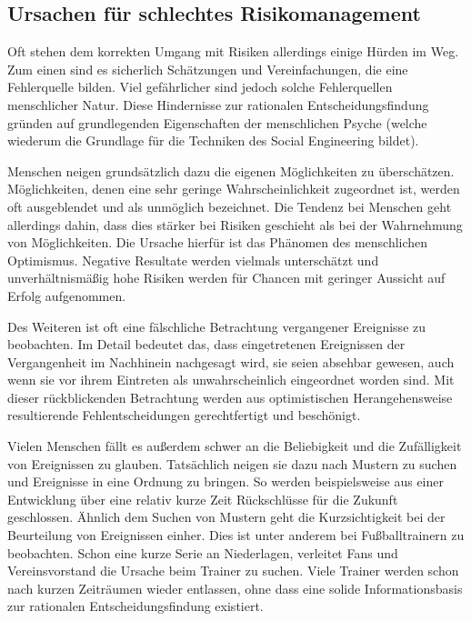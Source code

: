 \citep{risikomanagement}

\subsection{Ursachen für schlechtes Risikomanagement}\label{sec:ursachen}
Oft stehen dem korrekten Umgang mit Risiken allerdings einige Hürden im Weg. Zum einen sind es sicherlich Schätzungen und Vereinfachungen, die eine Fehlerquelle bilden. Viel gefährlicher sind jedoch solche Fehlerquellen menschlicher Natur. Diese Hindernisse zur rationalen Entscheidungsfindung gründen auf grundlegenden Eigenschaften der menschlichen Psyche (welche wiederum die Grundlage für die Techniken des Social Engineering bildet).

Menschen neigen grundsätzlich dazu die eigenen Möglichkeiten zu überschätzen.
Möglichkeiten, denen eine sehr geringe Wahrscheinlichkeit zugeordnet ist, werden oft ausgeblendet und
als unmöglich bezeichnet.
Die Tendenz bei Menschen geht allerdings dahin, dass dies stärker bei Risiken geschieht als bei der
Wahrnehmung von Möglichkeiten.
Die Ursache hierfür ist das Phänomen des menschlichen Optimismus.
Negative Resultate werden vielmals unterschätzt und unverhältnismäßig hohe Risiken werden für Chancen
mit geringer Aussicht auf Erfolg aufgenommen.

Des Weiteren ist oft eine fälschliche Betrachtung vergangener Ereignisse zu beobachten.
Im Detail bedeutet das, dass eingetretenen Ereignissen der Vergangenheit im Nachhinein nachgesagt
wird, sie seien absehbar gewesen, auch wenn sie vor ihrem Eintreten als unwahrscheinlich eingeordnet
worden sind.
Mit dieser rückblickenden Betrachtung werden aus optimistischen Herangehensweise resultierende
Fehlentscheidungen gerechtfertigt und beschönigt.

Vielen Menschen fällt es außerdem schwer an die Beliebigkeit und die Zufälligkeit von Ereignissen zu
glauben.
Tatsächlich neigen sie dazu nach Mustern zu suchen und Ereignisse in eine Ordnung zu bringen.
So werden beispielsweise aus einer Entwicklung über eine relativ kurze Zeit Rückschlüsse für die Zukunft geschlossen.
Ähnlich dem Suchen von Mustern geht die Kurzsichtigkeit bei der Beurteilung von Ereignissen einher.
Dies ist unter anderem bei Fußballtrainern zu beobachten.
Schon eine kurze Serie an Niederlagen, verleitet Fans und Vereinsvorstand die Ursache beim Trainer zu
suchen.
Viele Trainer werden schon nach kurzen Zeiträumen wieder entlassen, ohne dass eine solide
Informationsbasis zur rationalen Entscheidungsfindung existiert.

